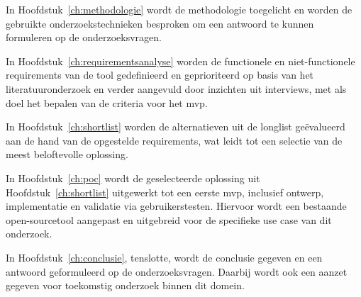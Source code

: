 In Hoofdstuk~\ref{ch:methodologie} wordt de methodologie toegelicht en worden de gebruikte onderzoekstechnieken besproken om een antwoord te kunnen formuleren op de onderzoeksvragen.

\vspace{1em}

In Hoofdstuk~\ref{ch:requirementsanalyse} worden de functionele en niet-functionele requirements van de tool gedefinieerd en geprioriteerd op basis van het literatuuronderzoek en verder aangevuld door inzichten uit interviews, met als doel het bepalen van de criteria voor het \acrshort{mvp}.

\vspace{1em}

In Hoofdstuk~\ref{ch:shortlist} worden de alternatieven uit de longlist geëvalueerd aan de hand van de opgestelde requirements, wat leidt tot een selectie van de meest beloftevolle oplossing.

\vspace{1em}

In Hoofdstuk~\ref{ch:poc} wordt de geselecteerde oplossing uit Hoofdstuk~\ref{ch:shortlist} uitgewerkt tot een eerste \acrshort{mvp}, inclusief ontwerp, implementatie en validatie via gebruikerstesten. Hiervoor wordt een bestaande open-sourcetool aangepast en uitgebreid voor de specifieke use case van dit onderzoek.

\vspace{1em}

In Hoofdstuk~\ref{ch:conclusie}, tenslotte, wordt de conclusie gegeven en een antwoord geformuleerd op de onderzoeksvragen. Daarbij wordt ook een aanzet gegeven voor toekomstig onderzoek binnen dit domein.